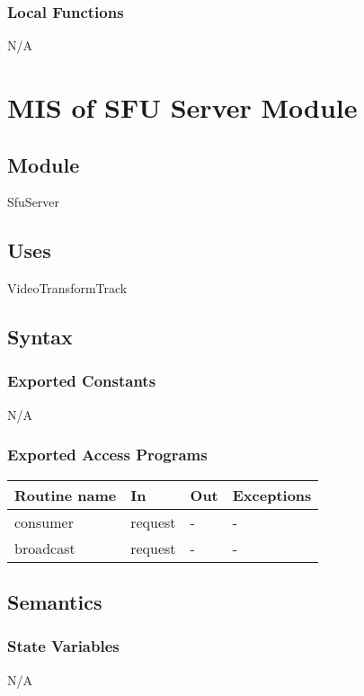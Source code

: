 \documentclass[12pt, titlepage]{article}
\begin{document}
\subsubsection{Local Functions}
N/A

\section{MIS of SFU Server Module} \label{sec:sfuserver}

\subsection{Module}
SfuServer

\subsection{Uses}
VideoTransformTrack

\subsection{Syntax}

\subsubsection{Exported Constants}
N/A

\subsubsection{Exported Access Programs}
\begin{table}[h!]
  \centering
  \begin{tabular}{llll}
    \hline
    \textbf{Routine name} & \textbf{In}   & \textbf{Out} & \textbf{Exceptions} \\
    \hline
    consumer        & request & -      & -             \\
    broadcast       & request & -      & -             \\
    \hline
  \end{tabular}
\end{table}

\subsection{Semantics}

\subsubsection{State Variables}
N/A
\end{document}
